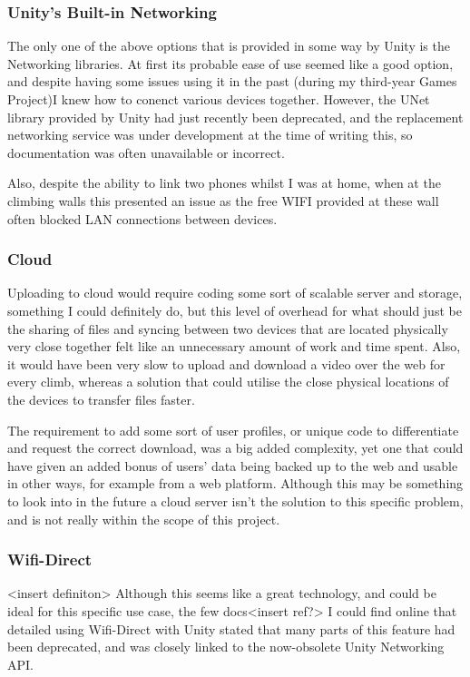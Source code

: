\subsubsection{Unity's Built-in Networking}
The only one of the above options that is provided in some way by Unity is the Networking libraries.
At first its probable ease of use seemed like a good option, and despite having some issues using it in the past (during my third-year Games Project)I knew how to conenct various devices together.
However, the UNet library provided by Unity had just recently been deprecated, and the replacement networking service was under development at the time of writing this, so documentation was often unavailable or incorrect.

Also, despite the ability to link two phones whilst I was at home, when at the climbing walls this presented an issue as the free WIFI provided at these wall often blocked LAN connections between devices.

\subsubsection{Cloud}
Uploading to cloud would require coding some sort of scalable server and storage, something I could definitely do, but this level of overhead for what should just be the sharing of files and syncing between two devices that are located physically very close together felt like an unnecessary amount of work and time spent.
Also, it would have been very slow to upload and download a video over the web for every climb, whereas a solution that could utilise the close physical locations of the devices to transfer files faster.

The requirement to add some sort of user profiles, or unique code to differentiate and request the correct download, was a big added complexity, yet one that could have given an added bonus of users' data being backed up to the web and usable in other ways, for example from a web platform.
Although this may be something to look into in the future a cloud server isn't the solution to this specific problem, and is not really within the scope of this project.

\subsubsection{Wifi-Direct}
<insert definiton>
Although this seems like a great technology, and could be ideal for this specific use case, the few docs<insert ref?> I could find online that detailed using Wifi-Direct with Unity stated that many parts of this feature had been deprecated, and was closely linked to the now-obsolete Unity Networking API.


